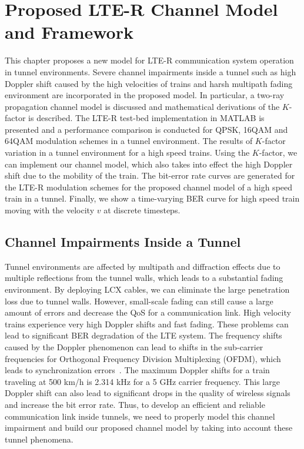 \chapter{Proposed LTE-R Channel Model and Framework}
\label{chapter4}

This chapter proposes a new model for LTE-R communication system operation in tunnel environments. Severe channel impairments inside a tunnel such as high Doppler shift caused by the high velocities of trains and harsh multipath fading environment are incorporated in the proposed model. In particular, a two-ray propagation channel model is discussed and mathematical derivations of the $K$-factor is described. The LTE-R test-bed implementation in MATLAB is presented and a performance comparison is conducted for QPSK, 16QAM and 64QAM modulation schemes in a tunnel environment. The results of $K$-factor variation in a tunnel environment for a high speed trains. Using the $K$-factor, we can implement our channel model, which also takes into effect the high Doppler shift due to the mobility of the train. The bit-error rate curves are generated for the LTE-R modulation schemes for the proposed channel model of a high speed train in a tunnel. Finally, we show a time-varying BER curve for high speed train moving with the velocity $v$ at discrete timesteps.

\section{Channel Impairments Inside a Tunnel}
Tunnel environments are affected by multipath and diffraction effects due to multiple reflections from the tunnel walls, which leads to a substantial fading environment. By deploying LCX cables, we can eliminate the large penetration loss due to tunnel walls. However, small-scale fading can still cause a large amount of errors and decrease the QoS for a communication link. High velocity trains experience very high Doppler shifts and fast fading. These problems can lead to significant BER degradation of the LTE system. The frequency shifts caused by the Doppler phenomenon can lead to shifts in the sub-carrier frequencies for Orthogonal Frequency Division Multiplexing (OFDM), which leads to synchronization errors~\cite{inplter9}. The maximum Doppler shifts for a train traveling at 500 km/h is 2.314 kHz for a 5 GHz carrier frequency. This large Doppler shift can also lead to significant drops in the quality of wireless signals and increase the bit error rate. Thus, to develop an efficient and reliable communication link inside tunnels, we need to properly model this channel impairment and build our proposed channel model by taking into account these tunnel phenomena.


